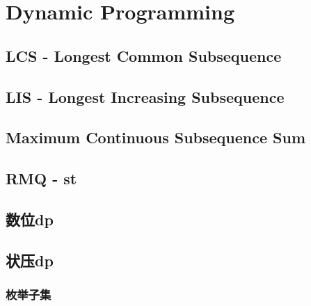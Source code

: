 \section{Dynamic Programming}
	\subsection{LCS - Longest Common Subsequence}
		
	\subsection{LIS - Longest Increasing Subsequence}
		
	\subsection{Maximum Continuous Subsequence Sum}
		
	\subsection{RMQ - st}
		
	\subsection{数位dp}
		
	\subsection{状压dp}
		\subsubsection{枚举子集}
			
